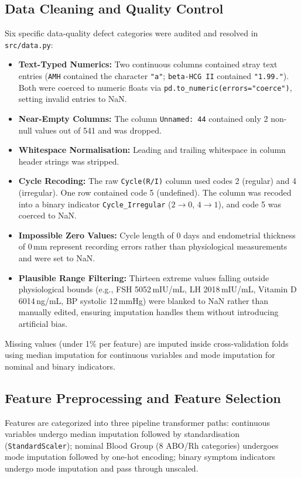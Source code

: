 \documentclass[10pt,twocolumn,a4paper]{article}
\begin{document}
\subsection{Data Cleaning and Quality Control}
Six specific data-quality defect categories were audited and resolved in \texttt{src/data.py}:
\begin{itemize}[leftmargin=*,topsep=2pt,itemsep=2pt]
  \item \textbf{Text-Typed Numerics:} Two continuous columns contained stray text entries (\texttt{AMH} contained
        the character \texttt{"a"}; \texttt{beta-HCG II} contained \texttt{"1.99."}).  Both were coerced to numeric floats via
        \texttt{pd.to\_numeric(errors="coerce")}, setting invalid entries to NaN.
  \item \textbf{Near-Empty Columns:} The column \texttt{Unnamed: 44} contained only 2 non-null values out of 541 and was dropped.
  \item \textbf{Whitespace Normalisation:} Leading and trailing whitespace in column header strings was stripped.
  \item \textbf{Cycle Recoding:} The raw \texttt{Cycle(R/I)} column used codes 2 (regular) and 4 (irregular). One row contained
        code 5 (undefined).  The column was recoded into a binary indicator \texttt{Cycle\_Irregular} ($2 \to 0$, $4 \to 1$),
        and code 5 was coerced to NaN.
  \item \textbf{Impossible Zero Values:} Cycle length of 0 days and endometrial thickness of 0\,mm represent recording errors rather
        than physiological measurements and were set to NaN.
  \item \textbf{Plausible Range Filtering:} Thirteen extreme values falling outside physiological bounds (e.g., FSH 5052\,mIU/mL,
        LH 2018\,mIU/mL, Vitamin D 6014\,ng/mL, BP systolic 12\,mmHg) were blanked to NaN rather than manually edited, ensuring
        imputation handles them without introducing artificial bias.
\end{itemize}

Missing values (under 1\% per feature) are imputed inside cross-validation folds using median imputation for continuous variables
and mode imputation for nominal and binary indicators.

\subsection{Feature Preprocessing and Feature Selection}
Features are categorized into three pipeline transformer paths:
continuous variables undergo median imputation followed by standardisation (\texttt{StandardScaler});
nominal Blood Group (8 ABO/Rh categories) undergoes mode imputation followed by one-hot encoding;
binary symptom indicators undergo mode imputation and pass through unscaled.
\end{document}

